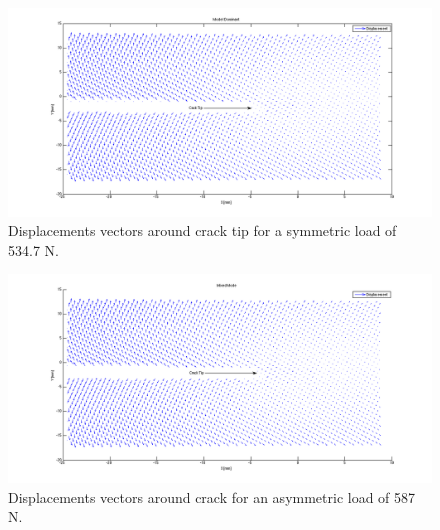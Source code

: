 \documentclass[12pt]{article}
\begin{document}
\begin{figure}[H]
	\centering
	\includegraphics[width=1.0\textwidth,scale=1]{QuiverModeI.png}
	\caption{Displacements vectors around crack tip for a symmetric load of 534.7 N.}
	\label{fig:Quiver1}
\end{figure}

\begin{figure}[H]
	\centering
	\includegraphics[width=1.0\textwidth, scale=1]{quiverMixedMode.png}
	\caption{Displacements vectors around crack for an asymmetric load of 587 N.}
	\label{fig:QuiverMix}
\end{figure}
\end{document}
